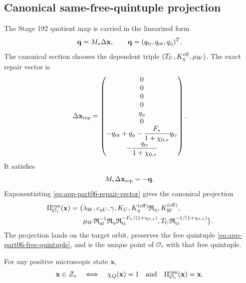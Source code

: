 \subsection{Canonical same-free-quintuple projection}
\label{subsec:app-part06-canonical-same-free-quintuple-projection}

The Stage 192 quotient map is carried in the linearized form
\begin{equation}
\label{eq:app-part06-Mstar-map}
\mathbf q=M_*\Delta\mathbf x,
\qquad
\mathbf q=(q_{\rm tr},q_{\rm nt},q_\eta)^T.
\end{equation}
The canonical section chooses the dependent triple \((T_U,K_\eta^{\rm eff},\mu_W)\).  The exact repair vector is
\begin{equation}
\label{eq:app-part06-repair-vector}
\Delta\mathbf x_{\rm rep}
=
\begin{pmatrix}
0\\
0\\
0\\
0\\
q_\eta\\
0\\
-q_{\rm nt}+q_\eta-\dfrac{F_*}{1+\chi_{0,*}}q_{\rm tr}\\[6pt]
-\dfrac{q_{\rm tr}}{1+\chi_{0,*}}
\end{pmatrix}.
\end{equation}
It satisfies
\begin{equation}
\label{eq:app-part06-repair-cancels-q}
M_*\Delta\mathbf x_{\rm rep}=-\mathbf q.
\end{equation}
Exponentiating \eqref{eq:app-part06-repair-vector} gives the canonical projection
\begin{equation}
\label{eq:app-part06-canonical-projection}
\begin{aligned}
\Pi_{\mathcal O_*}^{\rm can}(\mathbf x)
=\bigl(&
\lambda_W,
 c_{\eta U},
 \gamma,
 K_U,
 K_\eta^{(\mathrm{eff})}\mathfrak R_\eta,
 K_W^{(\mathrm{eff})},\\
&\mu_W\mathfrak R_{\rm nt}^{-1}\mathfrak R_\eta\mathfrak R_{\rm tr}^{-F_* /(1+\chi_{0,*})},
 T_U\mathfrak R_{\rm tr}^{-1/(1+\chi_{0,*})}
\bigr).
\end{aligned}
\end{equation}
The projection lands on the target orbit, preserves the free quintuple \eqref{eq:app-part06-free-quintuple}, and is the unique point of \(\mathcal O_*\) with that free quintuple.

\begin{proposition}
\label{prop:app-part06-canonical-fixed-point-audit}
For any positive microscopic state \(\mathbf x\),
\begin{equation}
\label{eq:app-part06-canonical-fixed-point}
\mathbf x\in\mathcal Z_*
\quad\Longleftrightarrow\quad
\chi_Q(\mathbf x)=1
\quad\text{and}\quad
\Pi_{\mathcal O_*}^{\rm can}(\mathbf x)=\mathbf x.
\end{equation}
\end{proposition}


